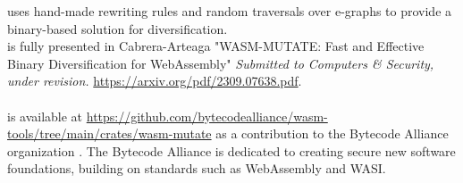 

\begin{tcolorbox}[title=Contribution paper and artifact,boxrule=1pt,arc=.2em,boxsep=1.0mm]
  \tool uses hand-made rewriting rules and random traversals over e-graphs to provide a binary-based solution for \Wasm diversification. \\
  \tool is fully presented in Cabrera-Arteaga \etal "WASM-MUTATE: Fast and Effective Binary Diversification for WebAssembly"
  \emph{Submitted to Computers \& Security, under revision. }
 \url{https://arxiv.org/pdf/2309.07638.pdf}.
  \\\\
  \tool is available at \url{https://github.com/bytecodealliance/wasm-tools/tree/main/crates/wasm-mutate} as a contribution to the Bytecode Alliance organization . The Bytecode Alliance is dedicated to creating secure new software foundations, building on standards such as WebAssembly and WASI.
\end{tcolorbox}
